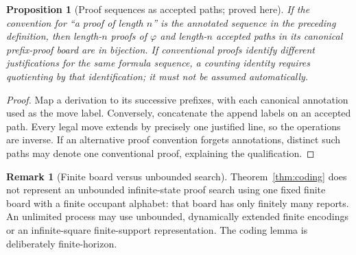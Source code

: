 \documentclass[11pt,letterpaper]{article}
\newtheorem{proposition}[theorem]{Proposition}
\theoremstyle{definition}
\newtheorem{remark}[theorem]{Remark}
\begin{document}
\begin{proposition}[Proof sequences as accepted paths; proved here]\label{prop:prefix}
If the convention for ``a proof of length $n$'' is the annotated sequence in the preceding definition, then length-$n$ proofs of $\varphi$ and length-$n$ accepted paths in its canonical prefix-proof board are in bijection. If conventional proofs identify different justifications for the same formula sequence, a counting identity requires quotienting by that identification; it must not be assumed automatically.
\end{proposition}
\begin{proof}
Map a derivation to its successive prefixes, with each canonical annotation used as the move label. Conversely, concatenate the append labels on an accepted path. Every legal move extends by precisely one justified line, so the operations are inverse. If an alternative proof convention forgets annotations, distinct such paths may denote one conventional proof, explaining the qualification.
\end{proof}

\begin{remark}[Finite board versus unbounded search]
Theorem~\ref{thm:coding} does not represent an unbounded infinite-state proof search using one fixed finite board with a finite occupant alphabet: that board has only finitely many reports. An unlimited process may use unbounded, dynamically extended finite encodings or an infinite-square finite-support representation. The coding lemma is deliberately finite-horizon.
\end{remark}
\end{document}
